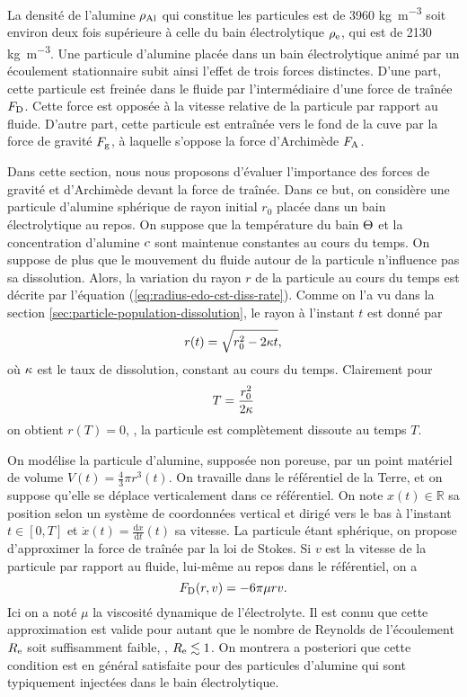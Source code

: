 La densité de l'alumine $\rho_\mathrm{Al}$ qui constitue les particules
est de \num{3960} \si{\kilo\gram\per\cubic\meter} soit environ deux
fois supérieure à celle du bain électrolytique $\rho_\mathrm{e}$,
qui est de \num{2130} \si{\kilo\gram\per\cubic\meter}. Une particule
d'alumine placée dans un bain électrolytique animé par un écoulement
stationnaire subit ainsi l'effet de trois forces
distinctes. D'une part, cette particule est freinée dans le fluide
par l'intermédiaire d'une force de traînée $F_{\mathrm D}$. Cette force
est opposée à la vitesse relative de la particule par rapport au
fluide. D'autre part, cette particule est entraînée vers le fond de
la cuve par la force de gravité $F_{\mathrm g}$, à laquelle s'oppose
la force d'Archimède $F_{\mathrm A}$.

Dans cette section, nous nous proposons d'évaluer l'importance des
forces de gravité et d'Archimède devant la force de traînée. Dans ce
but, on considère une particule d'alumine sphérique de rayon initial
$r_0$ placée dans un bain électrolytique au repos. On suppose que la
température du bain $\Theta$ et la concentration d'alumine
$c$ sont maintenue constantes au cours du temps. On
suppose de plus que le mouvement du fluide autour de la particule
n'influence pas sa dissolution. Alors, la variation du rayon $r$ de la
particule au cours du temps est décrite par l'équation
(\ref{eq:radius-edo-cst-diss-rate}). Comme on l'a vu dans la section
\ref{sec:particle-population-dissolution}, le rayon à l'instant $t$
est donné par
\begin{equation}\label{eq:radius}
  r(t) = \sqrt{r_0^2 - 2\kappa t},
\end{equation}
où $\kappa$ est le taux de dissolution, constant au cours du
temps. Clairement pour
\begin{equation}\label{eq:final-time}
  T = \frac{r_0^2}{2\kappa}
\end{equation}
on obtient $r(T) = 0$, \ie, la particule est complètement dissoute
au temps $T$.

On modélise la particule d'alumine, supposée non poreuse, par un point
matériel de volume $V(t) = \frac{4}{3}\pi r^3(t)$. On travaille dans
le référentiel de la Terre, et on suppose qu'elle se déplace
verticalement dans ce référentiel. On note $x(t)\in \mathbb R$ sa
position selon un système de coordonnées vertical et dirigé vers le
bas à l'instant $t\in [0,T]$ et $\dot x(t) = \frac{\mathrm dx}{\mathrm
  dt}(t)$ sa vitesse. La particule étant sphérique, on propose
d'approximer la force de traînée par la loi de Stokes. Si $v$ est la
vitesse de la particule par rapport au fluide, lui-même au repos dans
le référentiel, on a
\begin{equation*}
F_{\mathrm D}(r, v) = -6\pi\mu r v.
\end{equation*}
Ici on a noté $\mu$ la viscosité dynamique de l'électrolyte. Il est
connu que cette approximation est valide pour autant que le nombre de
Reynolds de l'écoulement $R_{\mathrm e}$ soit suffisamment faible, \ie,
$R_{\mathrm e} \lesssim 1$. On montrera a posteriori que cette condition
est en général satisfaite pour des particules d'alumine qui sont
typiquement injectées dans le bain électrolytique.

